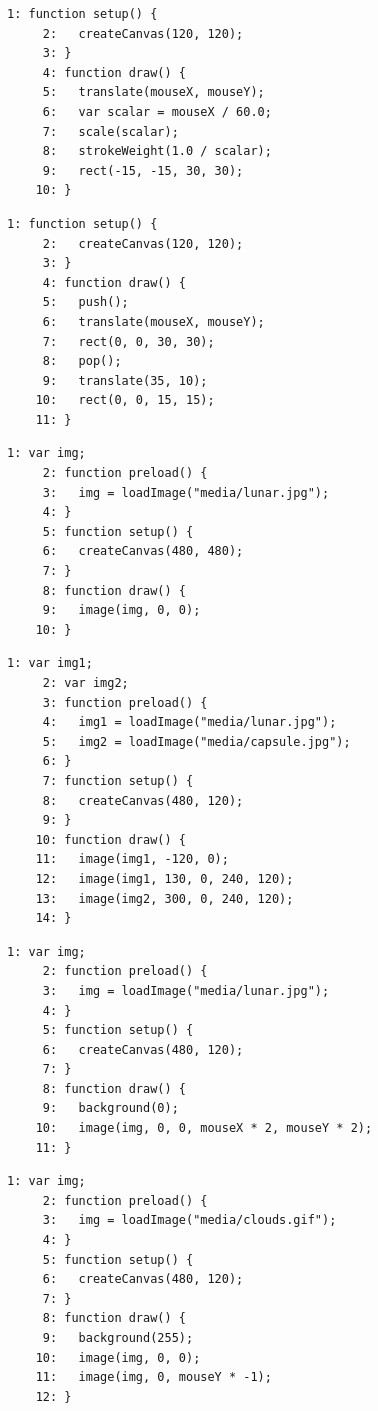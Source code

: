 \documentclass[a4j]{ltjsarticle}
\begin{document}
\vspace{1in}
\begin{lstlisting}[caption=Ex\_06\_09.js]
     1: function setup() {
     2:   createCanvas(120, 120);
     3: }
     4: function draw() {
     5:   translate(mouseX, mouseY);
     6:   var scalar = mouseX / 60.0;
     7:   scale(scalar);
     8:   strokeWeight(1.0 / scalar);
     9:   rect(-15, -15, 30, 30);
    10: }
\end{lstlisting}
\vspace{1in}
\begin{lstlisting}[caption=Ex\_06\_10.js]
     1: function setup() {
     2:   createCanvas(120, 120);
     3: }
     4: function draw() {
     5:   push();
     6:   translate(mouseX, mouseY);
     7:   rect(0, 0, 30, 30);
     8:   pop();
     9:   translate(35, 10);
    10:   rect(0, 0, 15, 15);
    11: }
\end{lstlisting}
\vspace{1in}
\begin{lstlisting}[caption=Ex\_07\_01.js]
     1: var img;
     2: function preload() {
     3:   img = loadImage("media/lunar.jpg");
     4: }
     5: function setup() {
     6:   createCanvas(480, 480);
     7: }
     8: function draw() {
     9:   image(img, 0, 0);
    10: }
\end{lstlisting}
\vspace{1in}
\begin{lstlisting}[caption=Ex\_07\_02.js]
     1: var img1;
     2: var img2;
     3: function preload() {
     4:   img1 = loadImage("media/lunar.jpg");
     5:   img2 = loadImage("media/capsule.jpg");
     6: }
     7: function setup() {
     8:   createCanvas(480, 120);
     9: }
    10: function draw() {
    11:   image(img1, -120, 0);
    12:   image(img1, 130, 0, 240, 120);
    13:   image(img2, 300, 0, 240, 120);
    14: }
\end{lstlisting}
\vspace{1in}
\begin{lstlisting}[caption=Ex\_07\_03.js]
     1: var img;
     2: function preload() {
     3:   img = loadImage("media/lunar.jpg");
     4: }
     5: function setup() {
     6:   createCanvas(480, 120);
     7: }
     8: function draw() {
     9:   background(0);
    10:   image(img, 0, 0, mouseX * 2, mouseY * 2);
    11: }
\end{lstlisting}
\vspace{1in}
\begin{lstlisting}[caption=Ex\_07\_04.js]
     1: var img;
     2: function preload() {
     3:   img = loadImage("media/clouds.gif");
     4: }
     5: function setup() {
     6:   createCanvas(480, 120);
     7: }
     8: function draw() {
     9:   background(255);
    10:   image(img, 0, 0);
    11:   image(img, 0, mouseY * -1);
    12: }
\end{lstlisting}
\end{document}
